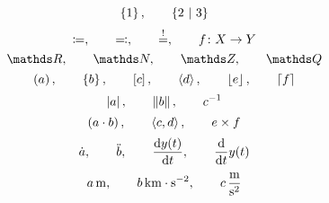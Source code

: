\documentclass[a4paper,fleqn, 11pt]{article}
\begin{document}
  \[
    \set{1}{}
    \separate
    \set{2}{3}
  \]
  \[
    \coloneqq
    ,\qquad
    \eqqcolon
    ,\qquad
    \stackrel{!}{=}
    ,\qquad
    f\colon X\to Y
  \]
  \[
    \setReal
    \separate
    \setNatural
    \separate
    \setInteger
    \separate
    \setRational
  \]
  \[
    \left( a \right)
    ,\qquad
    \left\{ b \right\}
    ,\qquad
    \left[ c \right]
    ,\qquad
    \left\langle d \right\rangle
    ,\qquad
    \left\lfloor e \right\rfloor
    ,\qquad
    \left\lceil f \right\rceil
  \]
  \[
    \left| a \right|
    ,\qquad
    \left\| b \right\|
    ,\qquad
    {c}^{-1}
  \]
  \[
    \left( a\cdot b \right)
    ,\qquad
    \left\langle c,d \right\rangle
    ,\qquad
    e \times f
  \]
  \[
    \dot{a}
    ,\qquad
    \ddot{b}
    ,\qquad
    \frac{\mathrm{d} y(t)}{\mathrm{d} t}
    ,\qquad
    \frac{\mathrm{d} }{\mathrm{d} t}y(t)
  \]
  \[
    a\, \mathrm{m}
    ,\qquad
    b\, \mathrm{km\cdot s^{-2}}
    ,\qquad
    c\, \mathrm{\frac{m}{s^2}}
  \]
\end{document}
